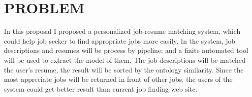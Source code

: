 \chapter{PROBLEM}
In this proposal I proposed a personalized job-resume matching system, which could help job seeker to find appropriate jobs more easily. In the system, job descriptions and resumes will be process by pipeline; and a finite automated tool will be used to extract the model of them. The job descriptions will be matched the user's resume, the result will be sorted by the ontology similarity. Since the most appreciate jobs will be returned in front of other jobs, the users of the system could get better result than current job finding web site.
